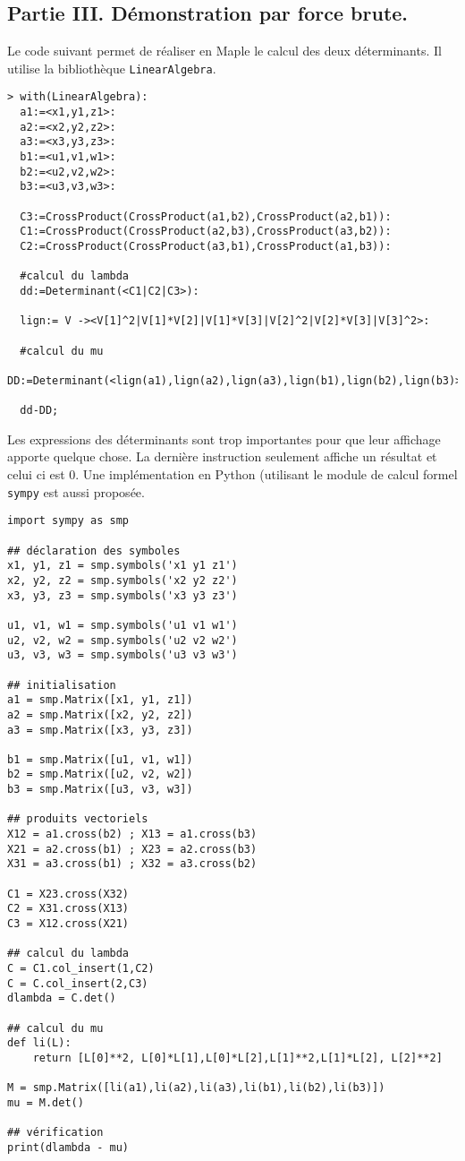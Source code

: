 \subsection*{Partie III. Démonstration par \og force brute\fg.}
Le code suivant permet de réaliser en Maple le calcul des deux déterminants. Il utilise la bibliothèque \verb|LinearAlgebra|. 
\begin{verbatim}
> with(LinearAlgebra):
  a1:=<x1,y1,z1>:
  a2:=<x2,y2,z2>:
  a3:=<x3,y3,z3>:
  b1:=<u1,v1,w1>:
  b2:=<u2,v2,w2>:
  b3:=<u3,v3,w3>:

  C3:=CrossProduct(CrossProduct(a1,b2),CrossProduct(a2,b1)):
  C1:=CrossProduct(CrossProduct(a2,b3),CrossProduct(a3,b2)):
  C2:=CrossProduct(CrossProduct(a3,b1),CrossProduct(a1,b3)):

  #calcul du lambda
  dd:=Determinant(<C1|C2|C3>):

  lign:= V -><V[1]^2|V[1]*V[2]|V[1]*V[3]|V[2]^2|V[2]*V[3]|V[3]^2>:

  #calcul du mu
  DD:=Determinant(<lign(a1),lign(a2),lign(a3),lign(b1),lign(b2),lign(b3)>):

  dd-DD;
\end{verbatim}
Les expressions des déterminants sont trop importantes pour que leur affichage apporte quelque chose. La dernière instruction seulement affiche un résultat et celui ci est $0$.\newline
Une implémentation en Python (utilisant le module de calcul formel \texttt{sympy} est aussi proposée.
\begin{verbatim}
import sympy as smp

## déclaration des symboles
x1, y1, z1 = smp.symbols('x1 y1 z1')
x2, y2, z2 = smp.symbols('x2 y2 z2')
x3, y3, z3 = smp.symbols('x3 y3 z3')

u1, v1, w1 = smp.symbols('u1 v1 w1')
u2, v2, w2 = smp.symbols('u2 v2 w2')
u3, v3, w3 = smp.symbols('u3 v3 w3')

## initialisation
a1 = smp.Matrix([x1, y1, z1])
a2 = smp.Matrix([x2, y2, z2])
a3 = smp.Matrix([x3, y3, z3])

b1 = smp.Matrix([u1, v1, w1])
b2 = smp.Matrix([u2, v2, w2])
b3 = smp.Matrix([u3, v3, w3])

## produits vectoriels
X12 = a1.cross(b2) ; X13 = a1.cross(b3) 
X21 = a2.cross(b1) ; X23 = a2.cross(b3)
X31 = a3.cross(b1) ; X32 = a3.cross(b2)

C1 = X23.cross(X32)
C2 = X31.cross(X13)
C3 = X12.cross(X21)

## calcul du lambda
C = C1.col_insert(1,C2)
C = C.col_insert(2,C3)
dlambda = C.det()

## calcul du mu
def li(L):
    return [L[0]**2, L[0]*L[1],L[0]*L[2],L[1]**2,L[1]*L[2], L[2]**2]

M = smp.Matrix([li(a1),li(a2),li(a3),li(b1),li(b2),li(b3)])
mu = M.det()

## vérification
print(dlambda - mu)
\end{verbatim}


